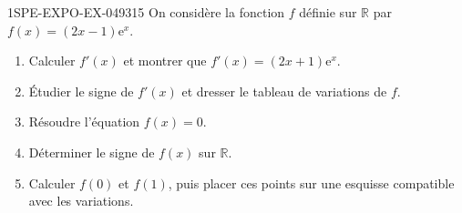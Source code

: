 \begin{exercice}{1SPE-EXPO-EX-049}{3}{15}
On considère la fonction $f$ définie sur $\mathbb{R}$ par $f(x) = (2x - 1)\mathrm{e}^x$.
\begin{enumerate}
\item Calculer $f'(x)$ et montrer que $f'(x) = (2x + 1)\mathrm{e}^x$.
\item Étudier le signe de $f'(x)$ et dresser le tableau de variations de $f$.
\item Résoudre l'équation $f(x) = 0$.
\item Déterminer le signe de $f(x)$ sur $\mathbb{R}$.
\item Calculer $f(0)$ et $f(1)$, puis placer ces points sur une esquisse compatible avec les variations.
\end{enumerate}
\end{exercice}
